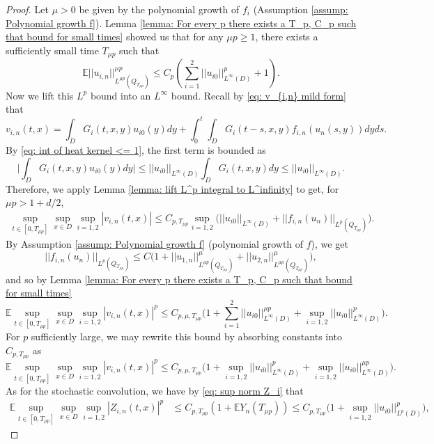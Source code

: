 \documentclass[12pt]{article}
\theoremstyle{definition}
\theoremstyle{remark}
\begin{document}
\begin{proof}
Let $\mu>0$ be given by the polynomial growth of $f_i$ (Assumption \ref{assump: Polynomial growth f}). Lemma \ref{lemma: For every p there exists a T_p, C_p such that bound for small times} showed us that for any $\mu p\geq 1$, there exists a sufficiently small time $T_{\mu p}$ such that
\[
\mathbb E||u_{i,n}||^{\mu p}_{L^{\mu p}(Q_{T_{\mu p}})}\leq C_{p}\left(\sum_{i=1}^2 ||u_{i0}||^p_{L^{\infty}(D)}+1\right).
\]
Now we lift this $L^p$ bound into an $L^{\infty}$ bound. Recall by \eqref{eq: v_{i,n} mild form} that
\[
v_{i,n}(t,x) = \int_D G_i(t,x,y)u_{i0}(y)dy + \int_0^t\int_D G_i(t-s,x,y)f_{i,n}(u_n(s,y))dyds.
\]
By \eqref{eq: int of heat kernel <= 1}, the first term is bounded as
\begin{equation*}
    \Bigg |\int_D G_i(t,x,y)u_{i0}(y)dy \Bigg | \leq ||u_{i0}||_{L^\infty(D)}\int_D G_i(t,x,y)dy \leq ||u_{i0}||_{L^\infty(D)}.
\end{equation*}
 Therefore, we apply Lemma \ref{lemma: lift L^p integral to L^infinity} to get, for $\mu p>1+d/2$,
\begin{align*}
\sup_{t\in [0,T_{\mu p}]}\sup_{x\in D}\sup_{i=1,2} |v_{i,n}(t,x)| \leq C_{p,T_{\mu p}}\sup_{i=1,2} \Big(||u_{i0}||_{L^{\infty}(D)} + ||f_{i,n}(u_n)||_{L^p(Q_{T_{\mu p}})}\Big).
\end{align*}
By Assumption \ref{assump: Polynomial growth f} (polynomial growth of $f$), we get
\[
||f_{i,n}(u_n)||_{L^p(Q_{T_{\mu p}})}\leq C\Big(1 + ||u_{1,n}||^{\mu}_{L^{\mu p}(Q_{T_{\mu p}})}+||u_{2,n}||^{\mu}_{L^{\mu p}(Q_{T_{\mu p}})}\Big),
\]
and so by Lemma \ref{lemma: For every p there exists a T_p, C_p such that bound for small times}
\[
\mathbb E \sup_{t\in [0,T_{\mu p}]}\sup_{x\in D}\sup_{i=1,2}|v_{i,n}(t,x)|^p\leq C_{p,\mu, T_{\mu p}}\Bigg(1+\sum\limits_{i=1}^2 ||u_{i0}||_{L^{\infty}(D)}^{\mu p}+ \sup_{i=1,2}||u_{i0}||^p_{L^{\infty}(D)}\Bigg).
\]
For $p$ sufficiently large, we may rewrite this bound by absorbing constants into $C_{p,T_{\mu p}}$ as
\[
\mathbb E \sup_{t\in [0,T_{\mu p}]}\sup_{x\in D}\sup_{i=1,2}|v_{i,n}(t,x)|^p\leq C_{p,\mu,T_{\mu p}}\Bigg(1+\sup_{i=1,2} ||u_{i0}||^p_{L^{\infty}(D)}+\sup_{i=1,2}||u_{i0}||^{\mu p}_{L^{\infty}(D)}\Bigg).
\]
As for the stochastic convolution, we have by \eqref{eq: sup norm Z_i} that
\begin{align*}
\mathbb E \sup_{t\in [0,T_{\mu p}]}\sup_{x\in D} \sup_{i=1,2}|Z_{i,n}(t,x)|^p &\leq C_{p,T_{\mu p}}(1+\mathbb EY_n(T_{\mu p}))\leq C_{p,T_{\mu p}}\Big(1+\sup_{i=1,2}||u_{i0}||_{L^p(D)}^p\Big),
\end{align*}

\end{proof}
\end{document}
